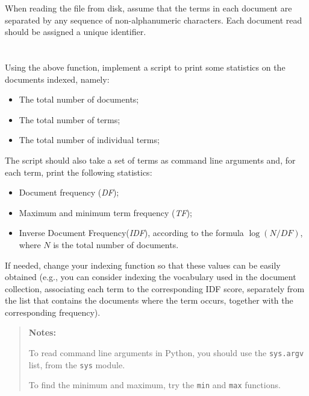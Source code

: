 \documentclass[12pt]{article}
\begin{document}
When reading the file from disk, assume that the terms in each document are separated by any sequence of non-alphanumeric characters. Each document read should be assigned a unique identifier.

\section{}

Using the above function, implement a script to print some statistics on the
documents indexed, namely:
\begin{itemize}
\item The total number of documents;
\item The total number of terms;
\item The total number of individual terms;
\end{itemize}

The script should also take a set of terms as command line arguments and,
for each term, print the following statistics:
\begin{itemize}
\item Document frequency (\emph{DF});
\item Maximum and minimum term frequency (\emph{TF});
\item Inverse Document Frequency(\emph{IDF}), according to the formula $\log(N/DF)$, where $N$ is the total
    number of documents.
\end{itemize}

If needed, change your indexing function so that these values can be easily
obtained (e.g., you can consider indexing the vocabulary used in the document collection, associating each term to the corresponding IDF score, separately from the list that contains the documents where the term occurs, together with the corresponding frequency).

\begin{quote}
    \textbf{Notes:} 

    To read command line arguments in Python, you should use the \texttt{sys.argv} list,
    from the \texttt{sys} module.

    To find the minimum and maximum, try the \texttt{min} and \texttt{max}
    functions.
\end{quote}

\section{}
\end{document}
